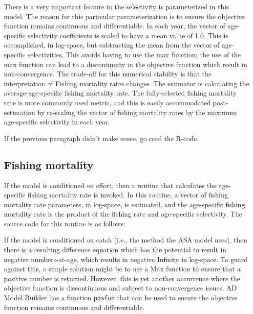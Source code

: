 \documentclass[12pt,letterpaper]{article}
\begin{document}
      There is a very important feature in the selectivity is parameterized in this model.  The reason for this particular parameterization is to ensure the objective function remains continuous and differentiable.  In each year, the vector of age-specific selectivity coefficients is scaled to have a mean value of 1.0.  This is accomplished, in log-space, but subtracting the mean from the vector of age-specific selectivities.  This avoids having to use the max function; the use of the max function can lead to a discontinuity in the objective function which result in non-convergence.  The trade-off for this numerical stability is that the interpretation of Fishing mortality rates changes.  The estimator is calculating the average-age-specific fishing mortality rate.  The fully-selected fishing mortality rate is more commonly used metric, and this is easily accommodated post-estimation by re-scaling the vector of fishing mortality rates by the maximum age-specific selectivity in each year. 

      If the previous paragraph didn't make sense, go read the R-code.


  \subsection{Fishing mortality} %
  \label{sub:fishing_mortality}
  If the model is conditioned on effort, then a routine that calculates the age-specific fishing mortality rate is invoked.  In this routine, a vector of fishing mortality rate parameters, in log-space, is estimated, and the age-specific fishing mortality rate is the product of the fishing rate and age-specific selectivity.  The source code for this routine is as follows:
  

  If the model is conditioned on catch (i.e., the method the ASA model uses), then there is a resulting difference equation which has the potential to result in negative numbers-at-age, which results in negative Infinity in log-space.  To guard against this, a simple solution might be to use a Max function to ensure that a positive number is returned. However, this is yet another occurrence where the objective function is discontinuous and subject to non-convergence issues.  AD Model Builder has a function \texttt{posfun} that can be used to ensure the objective function remains continuous and differentiable.
\end{document}
